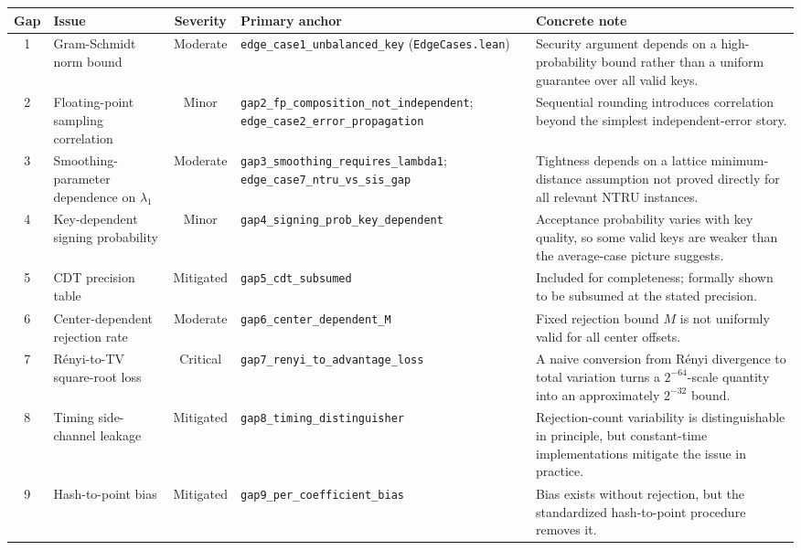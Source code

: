 \begin{table}[t]
\centering
\small
\begin{tabular}{|c|p{2.4cm}|c|p{3.0cm}|p{5.5cm}|}
\hline
\textbf{Gap} & \textbf{Issue} & \textbf{Severity} & \textbf{Primary anchor} & \textbf{Concrete note} \\
\hline
1 & Gram-Schmidt norm bound & Moderate & \texttt{edge\_case1\_unbalanced\_key} (\texttt{EdgeCases.lean}) & Security argument depends on a high-probability bound rather than a uniform guarantee over all valid keys. \\
\hline
2 & Floating-point sampling correlation & Minor & \texttt{gap2\_fp\_composition\_not\_independent}; \texttt{edge\_case2\_error\_propagation} & Sequential rounding introduces correlation beyond the simplest independent-error story. \\
\hline
3 & Smoothing-parameter dependence on $\lambda_1$ & Moderate & \texttt{gap3\_smoothing\_requires\_lambda1}; \texttt{edge\_case7\_ntru\_vs\_sis\_gap} & Tightness depends on a lattice minimum-distance assumption not proved directly for all relevant NTRU instances. \\
\hline
4 & Key-dependent signing probability & Minor & \texttt{gap4\_signing\_prob\_key\_dependent} & Acceptance probability varies with key quality, so some valid keys are weaker than the average-case picture suggests. \\
\hline
5 & CDT precision table & Mitigated & \texttt{gap5\_cdt\_subsumed} & Included for completeness; formally shown to be subsumed at the stated precision. \\
\hline
6 & Center-dependent rejection rate & Moderate & \texttt{gap6\_center\_dependent\_M} & Fixed rejection bound $M$ is not uniformly valid for all center offsets. \\
\hline
7 & R\'{e}nyi-to-TV square-root loss & Critical & \texttt{gap7\_renyi\_to\_advantage\_loss} & A naive conversion from R\'{e}nyi divergence to total variation turns a $2^{-64}$-scale quantity into an approximately $2^{-32}$ bound. \\
\hline
8 & Timing side-channel leakage & Mitigated & \texttt{gap8\_timing\_distinguisher} & Rejection-count variability is distinguishable in principle, but constant-time implementations mitigate the issue in practice. \\
\hline
9 & Hash-to-point bias & Mitigated & \texttt{gap9\_per\_coefficient\_bias} & Bias exists without rejection, but the standardized hash-to-point procedure removes it. \\

\end{tabular}
\end{table}
